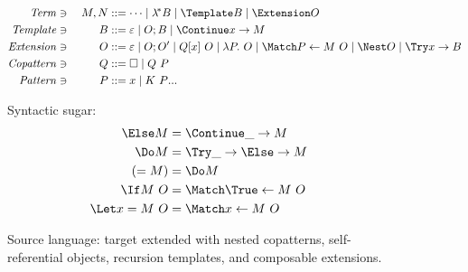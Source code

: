 \documentclass[runningheads]{llncs}
\begin{document}
\begin{figure}
\centering

\begin{alignat*}{2}
  \mathit{Term} &\ni{}& M, N
  &::= \dots
  \mid \lamstar B
  \mid \Template B
  \mid \Extension O
  \\
  \mathit{Template} &\ni{}& B
  &::= \varepsilon
  \mid O; B
  \mid \Continue x \to M
  \\
  \mathit{Extension} &\ni{}& O
  &::= \varepsilon
  \mid O; O'
  \mid Q[x] ~ O
  \mid \lambda P.~ O
  \mid \Match P \gets M ~ O
  \mid \Nest O
  \mid \Try x \to B
  \\
  \mathit{Copattern} &\ni{}& Q
  &::= \hole
  \mid Q ~ P
  \\
  \mathit{Pattern} &\ni{}& P
  &::= x
  \mid K ~ \many{P}
\end{alignat*}

Syntactic sugar:
\begin{align*}
  \Else M
  &=
  \Continue \_ \to M
  \\
  \Do M
  &=
  \Try \_ \to \Else \to M
  \\
  (= M)
  &=
  \Do M
  \\
  \If M ~ O
  &=
  \Match \True \gets M ~ O
  \\
  \Let x = M ~ O
  &=
  \Match x \gets M ~ O
\end{align*}
\caption{Source language: target extended with nested copatterns,
  self-referential objects, recursion templates, and composable extensions.}
\label{fig:source-syntax}
\end{figure}
\end{document}
